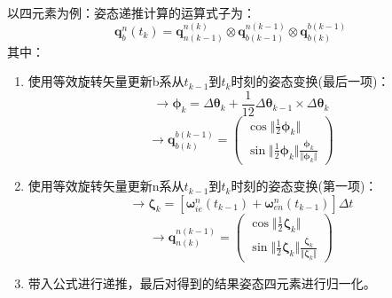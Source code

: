 \documentclass[12pt, twocolumn]{article}
\begin{document}
	以四元素为例：姿态递推计算的运算式子为：
	\begin{equation*}
		\boldsymbol{q}_b^n(t_k)=\boldsymbol{q}_{n(k-1)}^{n(k)}\otimes \boldsymbol{q}_{b(k-1)}^{n(k-1)}\otimes \boldsymbol{q}_{b(k)}^{b(k-1)}
	\end{equation*}
	其中：
	\begin{enumerate}
		\item 使用等效旋转矢量更新b系从$t_{k-1}$到$t_k$时刻的姿态变换(最后一项)：
		\begin{equation*}
			\to \boldsymbol{\phi}_k=\Delta \boldsymbol{\theta}_k+\frac{1}{12}\Delta \boldsymbol{\theta}_{k-1}\times \Delta\boldsymbol{\theta}_k
		\end{equation*}
		\begin{equation*}
			\to \boldsymbol{q}_{b(k)}^{b(k-1)}=\begin{pmatrix}
				\cos{\Vert\frac{1}{2}\boldsymbol{\phi}_k\Vert}\\
				\sin{\Vert\frac{1}{2}\boldsymbol{\phi}_k\Vert}\frac{\boldsymbol{\phi}_k}{\Vert\boldsymbol{\phi}_k\Vert}
			\end{pmatrix}
		\end{equation*}
		\item 使用等效旋转矢量更新n系从$t_{k-1}$到$t_k$时刻的姿态变换(第一项)：
		\begin{equation*}
			\to\boldsymbol{\zeta}_k=[\boldsymbol{\omega}_{ie}^n(t_{k-1})+\boldsymbol{\omega}_{en}^n(t_{k-1})]\Delta t
		\end{equation*}
			\begin{equation*}
		\to \boldsymbol{q}_{n(k)}^{n(k-1)}=\begin{pmatrix}
			\cos{\Vert\frac{1}{2}\boldsymbol{\zeta}_k\Vert}\\
			\sin{\Vert\frac{1}{2}\boldsymbol{\zeta}_k\Vert}\frac{\boldsymbol{\zeta}_k}{\Vert\boldsymbol{\zeta}_k\Vert}
		\end{pmatrix}
	\end{equation*}
	\item 带入公式进行递推，最后对得到的结果姿态四元素进行归一化。
	\end{enumerate}
\end{document}
